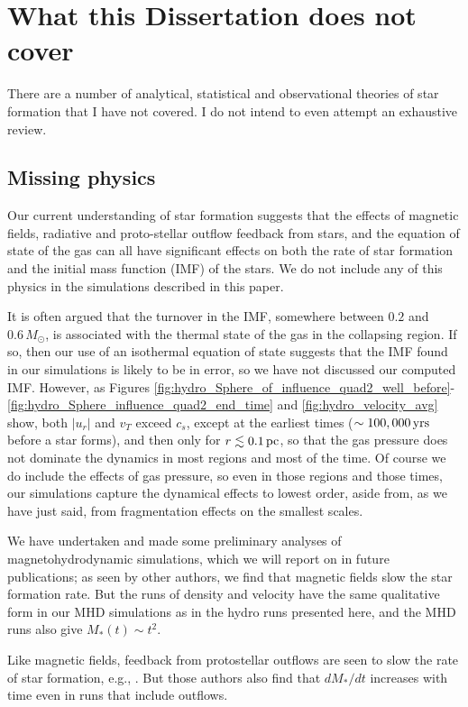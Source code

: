 \documentclass[../dissertation.tex]{subfiles}
\begin{document}
\section{What this Dissertation does not cover}
There are a number of analytical, statistical and observational theories of star formation that I have not covered.
 I do not intend to even attempt an exhaustive review.

\subsection{Missing physics}
Our current understanding of star formation suggests that the effects of magnetic 
fields, radiative and proto-stellar outflow feedback from stars, and the equation 
of state of the gas can 
all have significant effects on both the rate of star formation and the initial 
mass function (IMF) of the stars. We do not include any of this physics in the simulations
described in this paper. 

It is often argued that the turnover in the IMF, somewhere between $0.2$ and
 $0.6\,M_\odot$, is associated with the thermal state of the gas in the collapsing
region. If so, then our use of an isothermal equation of state suggests that the IMF found in our simulations is likely to be in error, so we have not discussed our computed IMF. However, as Figures \ref{fig:hydro_Sphere_of_influence_quad2_well_before}-\ref{fig:hydro_Sphere_influence_quad2_end_time} and \ref{fig:hydro_velocity_avg} show, both $|u_r|$ and $v_T$ exceed $c_s$, except at the earliest times ($\sim 100,000\,\rm yrs$ before a star forms), and then only for $r\lesssim0.1\,\rm pc$, so that the gas pressure does not dominate the dynamics in most regions and most of the time. Of course we do include the effects of gas pressure, so even in those regions and those times, our simulations capture the dynamical effects to lowest order, aside from, as we have just said, from fragmentation effects on the smallest scales. 

We have undertaken and made some preliminary analyses of magnetohydrodynamic simulations, which we will report on in future publications; as seen by other authors, we find that magnetic fields slow the star formation rate. But the runs of density and velocity have the same qualitative form in our MHD simulations as in the hydro runs presented here, and the MHD runs also give $M_*(t)\sim t^2$. 

Like magnetic fields, feedback from protostellar outflows are seen to slow the rate of star formation, e.g., \citet{2010ApJ...709...27W,2015MNRAS.450.4035F}. But those authors also find that $dM_*/dt$ increases with time even in runs that include outflows. 
\end{document}
